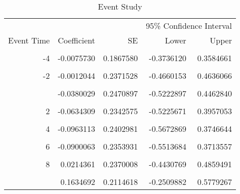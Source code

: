 \begin{table}

\caption{\label{tab:SAEst}Event Study}
\centering
\begin{tabular}[t]{rrrrr}
\toprule
\multicolumn{3}{c}{ } & \multicolumn{2}{c}{95\% Confidence Interval} \\
\cmidrule(l{3pt}r{3pt}){4-5}
Event Time & Coefficient & SE & Lower & Upper\\
\midrule
\cellcolor{gray!6}{-5} & \cellcolor{gray!6}{-0.0481866} & \cellcolor{gray!6}{0.1873409} & \cellcolor{gray!6}{-0.4153679} & \cellcolor{gray!6}{0.3189948}\\
-4 & -0.0075730 & 0.1867580 & -0.3736120 & 0.3584661\\
\cellcolor{gray!6}{-3} & \cellcolor{gray!6}{-0.0525203} & \cellcolor{gray!6}{0.2112834} & \cellcolor{gray!6}{-0.4666282} & \cellcolor{gray!6}{0.3615875}\\
-2 & -0.0012044 & 0.2371528 & -0.4660153 & 0.4636066\\
\cellcolor{gray!6}{-1} & \cellcolor{gray!6}{0.0250265} & \cellcolor{gray!6}{0.2434649} & \cellcolor{gray!6}{-0.4521559} & \cellcolor{gray!6}{0.5022090}\\
\addlinespace
0 & -0.0380029 & 0.2470897 & -0.5222897 & 0.4462840\\
\cellcolor{gray!6}{1} & \cellcolor{gray!6}{-0.0388197} & \cellcolor{gray!6}{0.2408278} & \cellcolor{gray!6}{-0.5108336} & \cellcolor{gray!6}{0.4331942}\\
2 & -0.0634309 & 0.2342575 & -0.5225671 & 0.3957053\\
\cellcolor{gray!6}{3} & \cellcolor{gray!6}{-0.0639702} & \cellcolor{gray!6}{0.2248330} & \cellcolor{gray!6}{-0.5046348} & \cellcolor{gray!6}{0.3766944}\\
4 & -0.0963113 & 0.2402981 & -0.5672869 & 0.3746644\\
\addlinespace
\cellcolor{gray!6}{5} & \cellcolor{gray!6}{-0.0619916} & \cellcolor{gray!6}{0.2230570} & \cellcolor{gray!6}{-0.4991752} & \cellcolor{gray!6}{0.3751921}\\
6 & -0.0900063 & 0.2353931 & -0.5513684 & 0.3713557\\
\cellcolor{gray!6}{7} & \cellcolor{gray!6}{-0.0069768} & \cellcolor{gray!6}{0.2452190} & \cellcolor{gray!6}{-0.4875971} & \cellcolor{gray!6}{0.4736436}\\
8 & 0.0214361 & 0.2370008 & -0.4430769 & 0.4859491\\
\cellcolor{gray!6}{9} & \cellcolor{gray!6}{0.0922565} & \cellcolor{gray!6}{0.2267394} & \cellcolor{gray!6}{-0.3521445} & \cellcolor{gray!6}{0.5366575}\\
\addlinespace
10 & 0.1634692 & 0.2114618 & -0.2509882 & 0.5779267\\
\bottomrule
\end{tabular}
\end{table}
